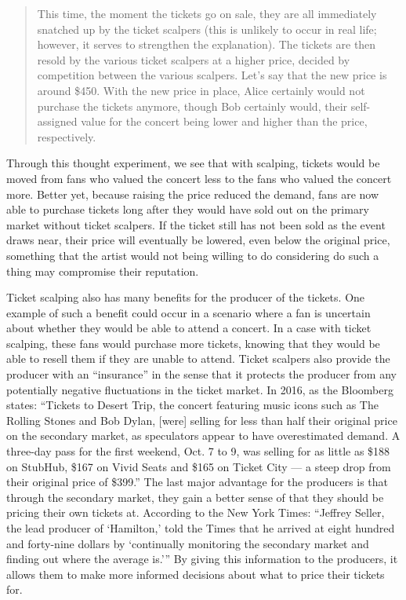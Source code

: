 \documentclass[12pt, a4paper, twoside]{article}
\begin{document}
\begin{quote}
This time, the moment the tickets go on sale, they are all immediately snatched up by the ticket scalpers (this is unlikely to occur in real life; however, it serves to strengthen the explanation). The tickets are then resold by the various ticket scalpers at a higher price, decided by competition between the various scalpers. Let’s say that the new price is around \$450. With the new price in place, Alice certainly would not purchase the tickets anymore, though Bob certainly would, their self-assigned value for the concert being lower and higher than the price, respectively.  
\end{quote}

Through this thought experiment, we see that with scalping, tickets would be moved from fans who valued the concert less to the fans who valued the concert more. Better yet, because raising the price reduced the demand, fans are now able to purchase tickets long after they would have sold out on the primary market without ticket scalpers. If the ticket still has not been sold as the event draws near, their price will eventually be lowered, even below the original price, something that the artist would not being willing to do considering do such a thing may compromise their reputation. 

Ticket scalping also has many benefits for the producer of the tickets. One example of such a benefit could occur in a scenario where a fan is uncertain about whether they would be able to attend a concert. In a case with ticket scalping, these fans would purchase more tickets, knowing that they would be able to resell them if they are unable to attend. Ticket scalpers also provide the producer with an “insurance” in the sense that it protects the producer from any potentially negative fluctuations in the ticket market. In 2016, as the Bloomberg states: “Tickets to Desert Trip, the concert featuring music icons such as The Rolling Stones and Bob Dylan, [were] selling for less than half their original price on the secondary market, as speculators appear to have overestimated demand. A three-day pass for the first weekend, Oct. 7 to 9, was selling for as little as \$188 on StubHub, \$167 on Vivid Seats and \$165 on Ticket City — a steep drop from their original price of \$399.” The last major advantage for the producers is that through the secondary market, they gain a better sense of that they should be pricing their own tickets at. According to the New York Times: “Jeffrey Seller, the lead producer of ‘Hamilton,’ told the Times that he arrived at eight hundred and forty-nine dollars by ‘continually monitoring the secondary market and finding out where the average is.’” By giving this information to the producers, it allows them to make more informed decisions about what to price their tickets for. 
\end{document}
